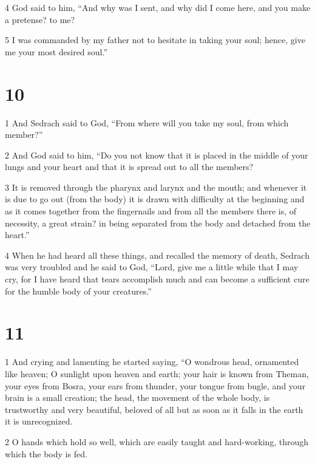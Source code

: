 \par 4 God said to him, “And why was I sent, and why did I come here, and you make a pretense? to me? 

\par 5 I was commanded by my father not to hesitate in taking your soul; hence, give me your most desired soul.”

\chapter{10}

\par 1 And Sedrach said to God, “From where will you take my soul, from which member?” 

\par 2 And God said to him, “Do you not know that it is placed in the middle of your lungs and your heart and that it is spread out to all the members? 

\par 3 It is removed through the pharynx and larynx and the mouth; and whenever it is due to go out (from the body) it is drawn with difficulty at the beginning and as it comes together from the fingernails and from all the members there is, of necessity, a great strain? in being separated from the body and detached from the heart.” 

\par 4 When he had heard all these things, and recalled the memory of death, Sedrach was very troubled and he said to God, “Lord, give me a little while that I may cry, for I have heard that tears accomplish much and can become a sufficient cure for the humble body of your creatures.” 

\chapter{11}


\par 1 And crying and lamenting he started saying, “O wondrous head, ornamented like heaven; O sunlight upon heaven and earth; your hair is known from Theman, your eyes from Bosra, your ears from thunder, your tongue from bugle, and your brain is a small creation; the head, the movement of the whole body, is trustworthy and very beautiful, beloved of all but as soon as it falls in the earth it is unrecognized. 

\par 2 O hands which hold so well, which are easily taught and hard-working, through which the body is fed. 

